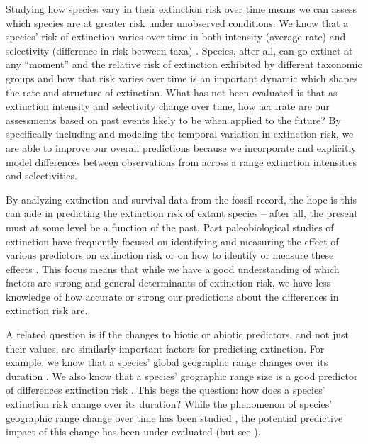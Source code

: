 \documentclass[12pt,letterpaper]{article}
\begin{document}
\begin{refsection}
Studying how species vary in their extinction risk over time means we can assess which species are at greater risk under unobserved conditions. We know that a species' risk of extinction varies over time in both intensity (average rate) and selectivity (difference in risk between taxa) \citep{Payne2007,Payne2016,Ezard2011}. Species, after all, can go extinct at any ``moment'' and the relative risk of extinction exhibited by different taxonomic groups and how that risk varies over time is an important dynamic which shapes the rate and structure of extinction. What has not been evaluated is that as extinction intensity and selectivity change over time, how accurate are our assessments based on past events likely to be when applied to the future? By specifically including and modeling the temporal variation in extinction risk, we are able to improve our overall predictions because we incorporate and explicitly model differences between observations from across a range extinction intensities and selectivities.

By analyzing extinction and survival data from the fossil record, the hope is this can aide in predicting the extinction risk of extant species -- after all, the present must at some level be a function of the past. Past paleobiological studies of extinction have frequently focused on identifying and measuring the effect of various predictors on extinction risk \citep{Harnik2011,Smits2015,Peters2008,Payne2007,Harnik2012,Ezard2011,Foote2006} or on how to identify or measure these effects \citep{Alroy2010a,Alroy2014,Alroy2001,Alroy2000,Alroy2000b,Foote2001}. This focus means that while we have a good understanding of which factors are strong and general determinants of extinction risk, we have less knowledge of how accurate or strong our predictions about the differences in extinction risk are. 


A related question is if the changes to biotic or abiotic predictors, and not just their values, are similarly important factors for predicting extinction. For example, we know that a species' global geographic range changes over its duration \citep{Foote2007,Liow2010,Liow2007,Kiessling2013}. We also know that a species' geographic range size is a good predictor of differences extinction risk \citep{Payne2007,Jablonski2003,Jablonski2008,Jablonski2006}. This begs the question: how does a species' extinction risk change over its duration? While the phenomenon of species' geographic range change over time has been studied \citep{Foote2007,Liow2010,Liow2007,Kiessling2013}, the potential predictive impact of this change has been under-evaluated (but see \citet{Kiessling2013}). 


\end{refsection}
\end{document}
